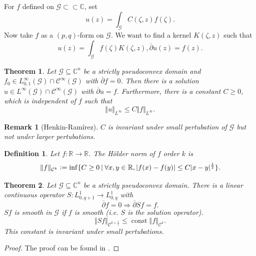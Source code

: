 \documentclass{article}
\newtheorem{theorem}{Theorem} [section]
\newtheorem{definition}{Definition}[section]
\newtheorem{remark}{Remark}[section]
\DeclareMathOperator{\const}{const}
\newcommand{\defeq}{\vcentcolon=}
\newcommand{\norm}[1]{\Vert #1 \Vert}
\newcommand{\R}[0]{\mathbb{R}}
\newcommand{\C}[0]{\mathbb{C}}
\newcommand{\G}[0]{\mathcal{G}}
\newcommand{\sep}[0]{\:|\:}
\newcommand{\cbd}[0]{\overline{\partial}}
\newcommand{\compembed}[0]{\subset\subset}
\newcommand{\ck}[1]{\mathcal{C}^{#1}}
\newcommand{\cinf}[0]{\ck{\infty}}
\begin{document}
    For $f$ defined on $\G\compembed\C$, set 
    \begin{equation*}
      u(z) = \int_\G C(\zeta,z)f(\zeta).
    \end{equation*}
    Now take $f$ as a $(p,q)$-form on $\G$. We want to find a kernel $K(\zeta,z)$ such that 
    \begin{equation*}
      u(z) = \int_\G f(\zeta)K(\zeta,z), \cbd u(z)=f(z).
    \end{equation*}
    \begin{theorem}
      Let $\G\subseteq\C^n$ be a strictly pseudoconvex domain and $f_0\in L^\infty_{0,1}(\G)\cap\cinf(\G)$ with $\cbd f = 0$. Then there is a solution $u\in L^\infty(\G)\cap\cinf(\G)$ with $\cbd u = f$. Furthermore, there is a constant $C\geq0$, which is independent of $f$ such that 
      \begin{equation*}
        \norm{u}_{L^\infty}\leq C\norm{f}_{L^\infty}.
      \end{equation*}
    \end{theorem}
    \begin{remark}[Henkin-Ramírez]
      $C$ is invariant under small pertubation of $\G$ but not under larger pertubations.
    \end{remark}
    \begin{definition}
      Let $f:\R\to\R$. The Hölder norm of $f$ order $k$ is 
      \begin{equation*}
        \norm{f}_{\mathcal{C}^k}\defeq\inf\{C\geq0\sep \forall x,y\in\R,\vert f(x)-f(y)\vert\leq C\vert x-y\vert^{{\frac 1 2}}\}.
      \end{equation*}
    \end{definition}
    \begin{theorem}
      Let $\G\subseteq\C^n$ be a strictly pseudoconvex domain. There is a linear continuous operator $S: L_{0,q+1}^1\to L_{0,q}^1$ with 
      \begin{equation*}
        \cbd f=0\Rightarrow \cbd Sf = f. 
      \end{equation*}
      $Sf$ is smooth in $\G$ if $f$ is smooth (i.e. $S$ is the solution operator).
      \begin{equation*}
        \norm{Sf}_{\mathcal{C}^{k+{\frac 1 2}}}\leq \const\norm{f}_{\mathcal{C}^k}.
      \end{equation*}
      This constant is invariant under small pertubations.
    \end{theorem}
    \begin{proof}
      The proof can be found in \cite{LiM}.
    \end{proof}
\end{document}
